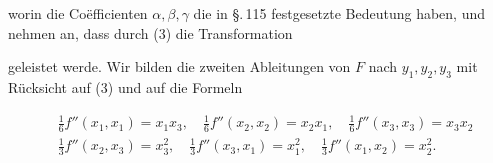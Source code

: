 worin die Coëfficienten $\alpha, \beta, \gamma$ die in \S.\,115 festgesetzte Bedeutung haben, und nehmen an, dass durch (3) die Transformation


geleistet werde. Wir bilden die zweiten Ableitungen von $F$ nach $y_1, y_2, y_3$ mit Rücksicht auf (3) und auf die Formeln

\[
\begin{aligned}
&\tfrac{1}{6} f''(x_1, x_1) = x_1 x_3, \quad \tfrac{1}{6} f''(x_2, x_2) = x_2 x_1, \quad \tfrac{1}{6} f''(x_3, x_3) = x_3 x_2 \\
&\tfrac{1}{3} f''(x_2, x_3) = x_3^2, \quad \tfrac{1}{3} f''(x_3, x_1) = x_1^2, \quad \tfrac{1}{3} f''(x_1, x_2) = x_2^2.
\end{aligned}
\]
